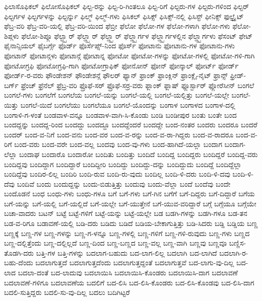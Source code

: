 {ಫಿಲಾಸೊಫಿಕಲ್
ಫಿಲೋಸೊಫಿಕಲ್
ಫಿಲ್ಟ-ರನ್ನು
ಫಿಲ್ಟ-ರಿ-ಗಿಂತಲೂ
ಫಿಲ್ಟ-ರಿಗೆ
ಫಿಲ್ಟರು-ಗಳ
ಫಿಲ್ಟರು-ಗಳಿಂದ
ಫಿಲ್ಟರ್
ಫಿಲ್ಟರ್ಗಳ
ಫಿಲ್ಟರ್ಗಳನ್ನು
ಫಿಲ್ಟರ್ನ್ನು
ಫಿಲ್ಮ್
ಫಿಲ್ಮ್-ಗಳು
ಫಿಸಿಕಲ್
ಫಿಸಿಕ್ಸ್
ಫಿಸಿಕ್ಸ್-ನಲ್ಲಿ
ಫಿಸಿಸ್ಟ್
ಫೀನಿಕ್ಸ್
ಫುಲ್ಬ್ರೈಟ್
ಫೆಬ್ರ-ವರಿ
ಫೆಬ್ರ-ವರಿ-ಯಲ್ಲಿ
ಫೆಬ್ರ-ವರಿ-ಯಿಂದ
ಫೆಬ್ರೀ
ಫೆಲೋ
ಫೆಲೋ-ಗಳ
ಫೆಲೋ-ಗಳಾಗಿ
ಫೆಲೋ-ಗಳು
ಫೆಲೋ-ಶಿಪ್ಗಳು
ಫೆಲೋ-ಶಿಪ್ಗೂ
ಫೆಲ್ಟ್ಸ್ಟಾರ್
ಫೆಲ್ಡ್ಸ್ಪಾರ್
ಫೆಲ್ಡ್ಸ್ಟಾರ್
ಫೆಲ್ಡ್ಸ್ಟಾರ್ಗಳ
ಫೆಲ್ಡ್ಸ್ಟಾರ್ಗಳಲ್ಲಿನ
ಫೆಲ್ಡ್ಸ್ಟಾರ್ಗಳು
ಫೆಸಂಟ್
ಫೇಟ್
ಫೈನಾನ್ಸಿಯಲ್
ಫೈಬರ್ಗ್ಗೆ
ಫೊರ್ಡ್
ಫೊರ್ಸೆಪ್ಸ್-ನಿಂದ
ಫೊರ್ಸ್
ಫೋಟಾನು
ಫೋಟಾನು-ಗಳ
ಫೋಟಾನು-ಗಳು
ಫೋಟಾನ್
ಫೋಟಾನ್ಗಳು
ಫೋಟಾನ್ಗೆ
ಫೋಟಾನ್ನ
ಫೋಟೋ
ಫೋಟೋ-ಗಳನ್ನು
ಫೋಟೋ-ಗಳಲ್ಲಿ
ಫೋಟೋ-ಗಳಿ-ಗಾಗಿ
ಫೋಟೋಗ್ರಫಿ
ಫೋಟೋಗ್ರಫಿ-ಗಾಗಿ
ಫೋಟೋಗ್ರಾಫಿಕ್
ಫೋನೋನ್
ಫೋನ್
ಫೋನ್ಕಾಲ್
ಫೋರ್ಟ್
ಫೋರ್ಡ್
ಫೋರ್ಡ್-ರ-ವರು
ಫೌಂಡೇಶನ್
ಫೌಂಡೇಶನ್ಗೆ
ಫೌಲರ್
ಫ್ಯಾನ್
ಫ್ರಾಂಕ್
ಫ್ರಾಂಕ್ಲಿನ್
ಫ್ರಾಂಕ್ಲೈ-ನೈಟ್
ಫ್ರಾನ್ಸ್
ಫ್ರೀಡ್-ಬರ್ಗ್
ಫ್ರೆಂಚ್
ಫ್ರೆನೆಲ್
ಫ್ರೆಬ್ರ-ವರಿ
ಫ್ರೊಫೆ-ಸರ್
ಫ್ರೊಫೆ-ಸರ್ರ-ವರು
ಫ್ಲಾಂಕ್
ಫ್ಲಾಷ್
ಫ್ಲೂರ್ಸ್ಟಾರ್
ಫ್ಲೋರೆಸೀನ್
ಬಂಗಲೆ
ಬಂಗಲೆ-ಗಳು
ಬಂಗಲೆಗೆ
ಬಂಗಲೆಯ
ಬಂಗಲೆ-ಯನ್ನು
ಬಂಗಲೆ-ಯಲ್ಲಿ
ಬಂಗಲೆ-ಯಲ್ಲಿತ್ತು
ಬಂಗಲೆ-ಯಲ್ಲೇ
ಬಂಗಲೆ-ಯಿತ್ತು
ಬಂಗಲೆ-ಯಿದೆ
ಬಂಗಲೆಯು
ಬಂಗಲೆಯೂ
ಬಂಗಲೆ-ಯೊಂದನ್ನು
ಬಂಗಾಳ
ಬಂಗಾಳದ
ಬಂಗಾಳ-ದಲ್ಲಿ
ಬಂಗಾಳಿ-ಗ-ಳಂತೆ
ಬಂಡವಾಳ-ವನ್ನೂ
ಬಂಡವಾಳ-ವಾಗಿ-ಸಿ-ಕೊಂಡು
ಬಂಡಿ
ಬಂಡೀಪುರ
ಬಂತು
ಬಂತೇ
ಬಂದ
ಬಂದದ್ದನ್ನು
ಬಂದದ್ದ-ರಿಂದ
ಬಂದದ್ದು
ಬಂದದ್ದೂ
ಬಂದದ್ದೆಂದರೆ
ಬಂದದ್ದೇ
ಬಂದ-ನಂತರ
ಬಂದರು
ಬಂದರೂ
ಬಂದರೆ
ಬಂದರ್
ಬಂದ-ವ-ನಿಗೆ
ಬಂದ-ವನು
ಬಂದ-ವರ
ಬಂದ-ವ-ರನ್ನು
ಬಂದ-ವ-ರಾ-ಗಿದ್ದರು
ಬಂದ-ವ-ರಾದರೂ
ಬಂದ-ವ-ರಿಗೆ
ಬಂದ-ವರು
ಬಂದ-ವರೇ
ಬಂದ-ವಲ್ಲ
ಬಂದವು
ಬಂದ-ವು-ಗಳು
ಬಂದ-ಹಾಗಿದೆ-ಯಲ್ಲಾ
ಬಂದಾಗ
ಬಂದಾಗ-ಲೆಲ್ಲಾ
ಬಂದಾಘ
ಬಂದಾರೊ
ಬಂದಾರೋ
ಬಂದಿತು
ಬಂದಿತ್ತು
ಬಂದಿದೆ
ಬಂದಿದ್ದ
ಬಂದಿದ್ದರು
ಬಂದಿದ್ದರೆ
ಬಂದಿದ್ದ-ವರು
ಬಂದಿದ್ದವು
ಬಂದಿದ್ದಾಗ
ಬಂದಿದ್ದಾರೆ
ಬಂದಿದ್ದೀರಿ
ಬಂದಿದ್ದು
ಬಂದಿದ್ದು-ದನ್ನು
ಬಂದಿದ್ದುದು
ಬಂದಿದ್ದೆ
ಬಂದಿದ್ದೆಲ್ಲಾ
ಬಂದಿದ್ದೆವು
ಬಂದಿರ-ಲಿಲ್ಲ
ಬಂದಿರಿ
ಬಂದಿ-ರುವ
ಬಂದಿ-ರು-ವುದು
ಬಂದಿಲ್ಲ
ಬಂದಿ-ಳಿ-ದರು
ಬಂದಿ-ಳಿ-ದವು
ಬಂದಿ-ಳಿ-ದೆವು
ಬಂದಿವೆ
ಬಂದು
ಬಂದುದ್ದನ್ನು
ಬಂದು-ಬಿಡುತ್ತಿತ್ತು
ಬಂದುವು
ಬಂದು-ವೆಲ್ಲಾ
ಬಂದೆ
ಬಂದೆವು
ಬಂದೇ
ಬಂದೊಡನೆ
ಬಂಧ
ಬಂಧು-ಗಳು
ಬಂಧು-ಗಳೂ
ಬಗೆ
ಬಗೆ-ಗಳು
ಬಗೆ-ಗಿನ
ಬಗೆಗೆ
ಬಗೆ-ದಿದ್ದರು
ಬಗೆ-ದಿದ್ದಾರೆ
ಬಗೆಯ
ಬಗೆ-ಯನ್ನು
ಬಗೆ-ಯಲ್ಲಿ
ಬಗೆ-ಯಲ್ಲಿದೆ
ಬಗೆ-ಯಲ್ಲೇ
ಬಗೆ-ಯುತ್ತೇನೆ
ಬಗೆ-ಯುವ-ವರಿದ್ದಾರೆ
ಬಗ್ಗೆ
ಬಗ್ಗೆಯೂ
ಬಗ್ಗೆಯೇ
ಬಚಾ-ವಾದರು
ಬಟನ್
ಬಟ್ಟೆ
ಬಟ್ಟೆ-ಗಳಿಗೆ
ಬಟ್ಟೆ-ಯನ್ನು
ಬಟ್ಟೆ-ಯಲ್ಲೇ
ಬಡ
ಬಡಗಿ-ಗಳನ್ನು
ಬಡಗಿ-ಗಳೂ
ಬಡ-ತನ
ಬಡ-ವ-ರಿಗೂ
ಬಡಾವಣೆ-ಯಲ್ಲಿ
ಬಡಿ-ದರು
ಬಡಿದು
ಬಡಿದೆ
ಬಡಿಯ-ಬೇಕಾಗುತ್ತಿತ್ತು
ಬಡಿ-ಸಿದರು
ಬಡ್ಡಿ
ಬಡ್ಡಿಯ
ಬಣ್ಣ
ಬಣ್ಣಕ್ಕೆ
ಬಣ್ಣ-ಗಳ
ಬಣ್ಣ-ಗಳನ್ನು
ಬಣ್ಣ-ಗ-ಳನ್ನೂ
ಬಣ್ಣ-ಗಳಲ್ಲಿ
ಬಣ್ಣ-ಗಳಿಗೆ
ಬಣ್ಣ-ಗಳಿ-ರುವುದು
ಬಣ್ಣ-ಗಳು
ಬಣ್ಣದ
ಬಣ್ಣ-ದಲ್ಲಿತ್ತೆಂದು
ಬಣ್ಣ-ದಲ್ಲಿಲ್ಲದೆ
ಬಣ್ಣ-ದಿಂದ
ಬಣ್ಣ-ಬಣ್ಣದ
ಬಣ್ಣ-ವಲ್ಲ
ಬಣ್ಣ-ವಾಗಿ
ಬಣ್ಣವು
ಬಣ್ಣವೂ
ಬಣ್ಣಿಸ-ತೊಡಗಿ-ದರು
ಬತ್ತಿ-ಗಳ
ಬತ್ತಿ-ಗಳನ್ನು
ಬದಲಾಗ-ಬಹುದು
ಬದ-ಲಾಗ-ಲಿಲ್ಲ
ಬದಲಾಗಿ
ಬದ-ಲಾಗಿದೆ
ಬದಲಾಗಿ-ರ-ಬಹು-ದೆಂದು
ಬದಲಾಗುತ್ತದೆ
ಬದಲಾಗುತ್ತದೆಂದು
ಬದಲಾಗುತ್ತದ್ದಂತೆ
ಬದಲಾಗುತ್ತವೆ
ಬದ-ಲಾಗು-ವು-ದಿಲ್ಲ
ಬದ-ಲಾದ
ಬದಲಾ-ದಂತೆ
ಬದ-ಲಾದುವು
ಬದಲಾಯಿಸಿ
ಬದಲಾಯಿಸಿ-ಕೊಂಡರು
ಬದಲಾಯಿಸಿ-ದಾಗ
ಬದಲಾವಣೆ
ಬದಲಾವಣೆ-ಗಳಿಗೂ
ಬದಲಾವಣೆಯ
ಬದಲಿಗೆ
ಬದ-ಲಿಸಿ
ಬದ-ಲಿಸಿ-ಕೊಂಡರು
ಬದ-ಲಿಸಿ-ಕೊಂಡವು
ಬದ-ಲಿಸಿ-ದಾಗ
ಬದಲಿ-ಸುತ್ತಿದ್ದರು
ಬದಲಿ-ಸು-ವು-ದಿಲ್ಲ
ಬದಲು
ಬದಿಗಿಟ್ಟರೆ
}
